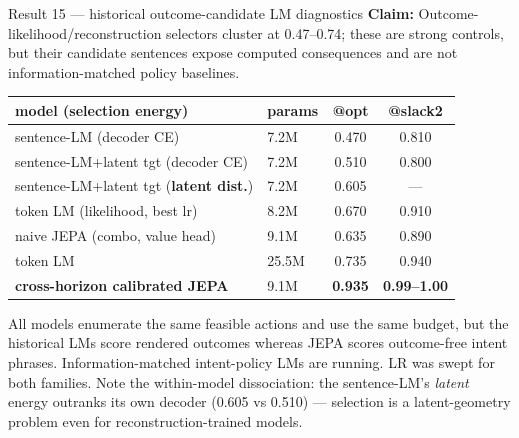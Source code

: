 \documentclass[aspectratio=169,10pt]{beamer}
\newcommand{\claim}[1]{\textcolor{cviolet}{\textbf{Claim:} #1}}
\begin{document}
\begin{frame}{Result 15 --- historical outcome-candidate LM diagnostics}
\claim{Outcome-likelihood/reconstruction selectors cluster at 0.47--0.74;
these are strong controls, but their candidate sentences expose computed
consequences and are not information-matched policy baselines.}
\centering\small
\begin{tabular}{llcc}
\toprule
model (selection energy) & params & @opt & @slack2\\
\midrule
sentence-LM (decoder CE) & 7.2M & 0.470 & 0.810\\
sentence-LM+latent tgt (decoder CE) & 7.2M & 0.510 & 0.800\\
sentence-LM+latent tgt (\textbf{latent dist.}) & 7.2M & 0.605 & ---\\
token LM (likelihood, best lr) & 8.2M & 0.670 & 0.910\\
naive JEPA (combo, value head) & 9.1M & 0.635 & 0.890\\
token LM & 25.5M & 0.735 & 0.940\\
\textbf{cross-horizon calibrated JEPA} & 9.1M & \textbf{0.935} & \textbf{0.99--1.00}\\
\bottomrule
\end{tabular}

\medskip\small
All models enumerate the same feasible actions and use the same budget, but
the historical LMs score rendered outcomes whereas JEPA scores outcome-free
intent phrases. Information-matched intent-policy LMs are running. LR was
swept for both families. Note the
within-model dissociation: the sentence-LM's \emph{latent} energy
outranks its own decoder (0.605 vs 0.510) --- selection is a
latent-geometry problem even for reconstruction-trained models.
\end{frame}
\end{document}
